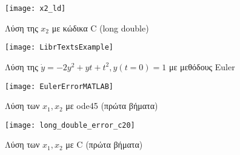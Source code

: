 \documentclass{article}
\begin{document}
\begin{figure}[hb]
 \centering
\texttt{[image: x2\_ld]}
\caption{Λύση της \(x_2\) με κώδικα C (long double)}
\label{l_38}
\end{figure}
\clearpage

\begin{landscape}
\begin{figure}[hb]
 \centering
\texttt{[image: LibrTextsExample]}
\caption{Λύση της \(\dot{y}=-2y^2+yt+t^2, y(t=0)=1\) με μεθόδους Euler}
\label{l_32}
\end{figure}
\end{landscape}
\clearpage

\begin{figure}[hb]
 \centering
\texttt{[image: EulerErrorMATLAB]}
\caption{Λύση των \(x_1, x_2\) με ode45 (πρώτα βήματα)}
\label{l_35}
\end{figure}

\begin{figure}[hb]
 \centering
\texttt{[image: long\_double\_error\_c20]}
\caption{Λύση των \(x_1, x_2\) με C (πρώτα βήματα)}
\label{l_36}
\end{figure}
\clearpage
\end{document}
